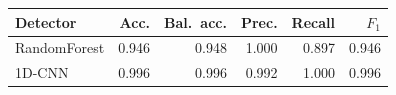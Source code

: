 \begin{tabular}{lrrrrr}
\toprule
Detector & Acc. & Bal.\ acc. & Prec. & Recall & $F_1$ \\
\midrule
RandomForest & 0.946 & 0.948 & 1.000 & 0.897 & 0.946 \\
1D-CNN & 0.996 & 0.996 & 0.992 & 1.000 & 0.996 \\
\bottomrule
\end{tabular}
